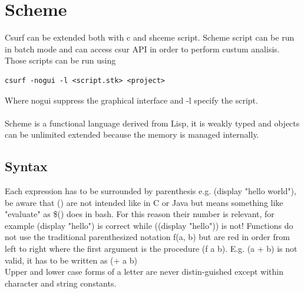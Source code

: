 
\section{Scheme}
Csurf can be extended both with c and shceme script. Scheme script can be run in batch mode and can access csur API in order to perform custum analisis. Those scripts can be run using 
\begin{lstlisting}
csurf -nogui -l <script.stk> <project>
\end{lstlisting}
Where nogui suppress the graphical interface and -l specify the script.
\\\\
Scheme is a functional language derived from Lisp, it is weakly typed and objects can be unlimited extended because the memory is managed internally.
\cite{abelson1991revised}
\subsection{Syntax}

Each expression has to be surrounded by parenthesis e.g. (display "hello world"), be aware that () are not intended like {} in C or Java but means something like "evaluate" as \$() does in bash. For this reason their number is relevant, for example (display "hello") is correct while ((display "hello")) is not!
Functions do not use the traditional parenthesized notation f(a, b) but are red in order from left to right where the first argument is the procedure (f a b). E.g. (a + b) is not valid, it has to be written as (+ a b)\\
Upper and lower case forms of a letter are never distin-guished except within character and string constants.\\

